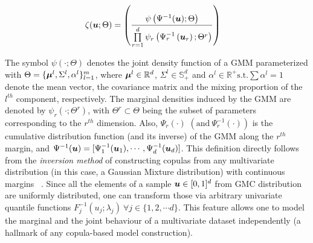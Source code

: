 \documentclass{article}
\theoremstyle{plain}
\theoremstyle{definition}
\theoremstyle{remark}
\begin{document}
\begin{align}\label{eq:GMC_density}
\zeta(\boldsymbol{u};\Theta) & = \left( \frac{\psi\left(\Psi^{-1}(\boldsymbol{u});\Theta\right)}{\prod\limits_{r=1}^{d}\psi_{r}\left(\Psi^{-1}_{r} \left( \boldsymbol{u}_r{} \right);\Theta^r \right)} \right)
\end{align}

The symbol $\psi(\cdot;\Theta)$ denotes the joint density function of a GMM parameterized with $\Theta = \{\boldsymbol{\mu}^l, \Sigma^l, \alpha^l\}_{l=1}^m$, where $\boldsymbol{\mu}^l \in \mathbb{R}^d$, $\Sigma^l \in \mathbb{S}_+^d$ and $\alpha^l \in \mathbb{R}^+ \text{s.t.} \sum \alpha^l=1$ denote the mean vector, the covariance matrix and the mixing proportion of the $l^{th}$ component, respectively. The marginal densities induced by the GMM are denoted by $\psi_r(\cdot;\Theta^r)$, with $\Theta^r\subset \Theta$ being the subset of parameters corresponding to the $r^{th}$ dimension. Also, $\Psi_r(\cdot)$ $\left(\text{and} \ \Psi^{-1}_r(\cdot) \right)$ is the cumulative distribution function (and its inverse) of the GMM along the $r^{th}$ margin, and $\Psi^{-1}(\boldsymbol{u})=[\Psi^{-1}_1(\boldsymbol{u}_1), \cdots, \Psi^{-1}_d(\boldsymbol{u}_d)]$. This definition directly follows from the \emph{inversion method} of constructing copulas from any multivariate distribution (in this case, a Gaussian Mixture distribution) with continuous margins ~\citep[see][chapter 3]{Nelsen1999Chapter3}. Since all the elements of a sample $\boldsymbol{u}\in [0,1]^d$ from GMC distribution are uniformly distributed, one can transform those via arbitrary univariate quantile functions $F_j^{-1}(u_j;\lambda_j) \ \forall j\in \{1,2,\cdots d\}$. This feature allows one to model the marginal and the joint behaviour of a multivariate dataset independently (a hallmark of any copula-based model construction).
\end{document}
